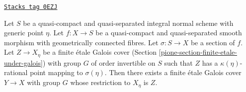 \begin{lemma}
\label{pione-lemma-extend-covering-general}
\href{https://stacks.math.columbia.edu/tag/0EZJ}{\texttt{Stacks tag 0EZJ}}

Let $S$ be a quasi-compact and quasi-separated integral normal scheme
with generic point $\eta$. Let $f : X \to S$ be a quasi-compact and
quasi-separated smooth morphism with geometrically connected fibres.
Let $\sigma : S \to X$ be a section of $f$. Let $Z \to X_\eta$ be a
finite \'etale Galois cover (Section \ref{pione-section-finite-etale-under-galois})
with group $G$ of order invertible on $S$ such that
$Z$ has a $\kappa(\eta)$-rational point mapping to $\sigma(\eta)$.
Then there exists a finite \'etale Galois cover $Y \to X$ with group $G$
whose restriction to $X_\eta$ is $Z$.
\end{lemma}

